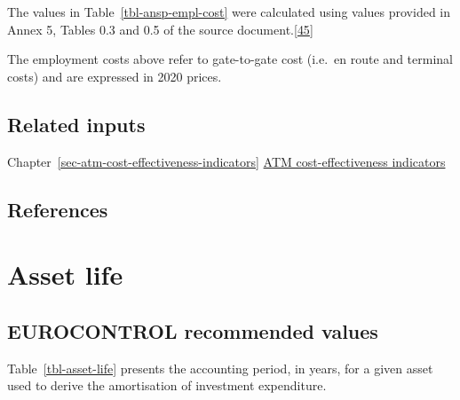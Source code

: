 \documentclass[
  11pt,
  a4paper,
]{book}
\begin{document}
The values in Table~\ref{tbl-ansp-empl-cost} were calculated using
values provided in Annex 5, Tables 0.3 and 0.5 of the source
document.\protect\hyperlink{ref-ace2020}{{[}45{]}}

\begin{tcolorbox}[enhanced jigsaw, opacityback=0, arc=.35mm, colframe=quarto-callout-note-color-frame, breakable, left=2mm, leftrule=.75mm, titlerule=0mm, colbacktitle=quarto-callout-note-color!10!white, rightrule=.15mm, opacitybacktitle=0.6, bottomtitle=1mm, colback=white, toptitle=1mm, title=\textcolor{quarto-callout-note-color}{\faInfo}\hspace{0.5em}{Note}, bottomrule=.15mm, toprule=.15mm, coltitle=black]

The employment costs above refer to gate-to-gate cost (i.e.~en route and
terminal costs) and are expressed in 2020 prices.

\end{tcolorbox}

\hypertarget{related-inputs-22}{%
\section{Related inputs}\label{related-inputs-22}}

Chapter~\ref{sec-atm-cost-effectiveness-indicators}
\protect\hyperlink{sec-atm-cost-effectiveness-indicators}{ATM
cost-effectiveness indicators}

\hypertarget{references-27}{%
\section{References}\label{references-27}}

\hypertarget{sec-asset-life}{%
\chapter{Asset life}\label{sec-asset-life}}

\hypertarget{eurocontrol-recommended-values-27}{%
\section{EUROCONTROL recommended
values}\label{eurocontrol-recommended-values-27}}

Table~\ref{tbl-asset-life} presents the accounting period, in years, for
a given asset used to derive the amortisation of investment expenditure.
\end{document}
